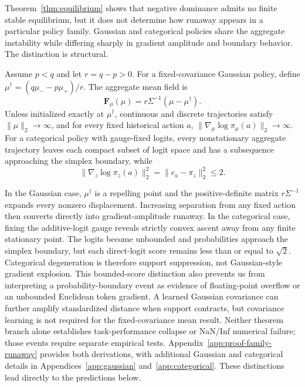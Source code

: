 Theorem~\ref{thm:equilibrium} shows that negative dominance admits no finite stable equilibrium, but it does not determine how runaway appears in a particular policy family. Gaussian and categorical policies share the aggregate instability while differing sharply in gradient amplitude and boundary behavior. The distinction is structural.
\begin{theorem}
\label{thm:family-runaway}
Assume $p<q$ and let $r=q-p>0$. For a fixed-covariance Gaussian policy, define $\mu^\dagger=(q\mu_--p\mu_+)/r$. The aggregate mean field is
\begin{equation}
\mathbf F_\mu(\mu)=r\Sigma^{-1}(\mu-\mu^\dagger).
\label{eq:gaussian-runaway}
\end{equation}
Unless initialized exactly at $\mu^\dagger$, continuous and discrete trajectories satisfy $\|\mu\|_2\to\infty$, and for every fixed historical action $a$, $\|\nabla_\mu\log\pi_\mu(a)\|_2\to\infty$. For a categorical policy with gauge-fixed logits, every nonstationary aggregate trajectory leaves each compact subset of logit space and has a subsequence approaching the simplex boundary, while
\begin{equation}
\|\nabla_z\log\pi_z(a)\|_2^2=\|e_a-\pi_z\|_2^2\le2.
\label{eq:categorical-bound}
\end{equation}
\end{theorem}
In the Gaussian case, $\mu^\dagger$ is a repelling point and the positive-definite matrix $r\Sigma^{-1}$ expands every nonzero displacement. Increasing separation from any fixed action then converts directly into gradient-amplitude runaway. In the categorical case, fixing the additive-logit gauge reveals strictly convex ascent away from any finite stationary point. The logits become unbounded and probabilities approach the simplex boundary, but each direct-logit score remains less than or equal to $\sqrt{2}$. Categorical degeneration is therefore support suppression, not Gaussian-style gradient explosion. This bounded-score distinction also prevents us from interpreting a probability-boundary event as evidence of floating-point overflow or an unbounded Euclidean token gradient. A learned Gaussian covariance can further amplify standardized distance when support contracts, but covariance learning is not required for the fixed-covariance mean result. Neither theorem branch alone establishes task-performance collapse or NaN/Inf numerical failure; those events require separate empirical tests. Appendix~\ref{app:proof-family-runaway} provides both derivations, with additional Gaussian and categorical details in Appendices~\ref{app:gaussian} and~\ref{app:categorical}. These distinctions lead directly to the predictions below.

